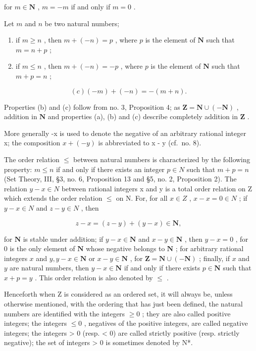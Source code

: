 for \(m \in \mathbf{N}\) , \(m = -m\) if and only if \(m = 0\) .

Let \(m\) and \(n\) be two natural numbers;

\begin{enumerate}
\def\labelenumi{(\alph{enumi})}
\item
  if \(m \geqslant n\) , then \(m + (-n) = p\) , where \(p\) is the element of \(\mathbf{N}\) such that \(m = n + p\) ;
\item
  if \(m \leqslant n\) , then \(m + (-n) = -p\) , where \(p\) is the element of \(\mathbf{N}\) such that \(m + p = n\) ;
\end{enumerate}

\[
(c) (- m) + (- n) = - (m + n).
\]

Properties (b) and (c) follow from no. 3, Proposition 4; as \(\mathbf{Z} = \mathbf{N} \cup (-\mathbf{N})\) , addition in \(\mathbf{N}\) and properties (a), (b) and (c) describe completely addition in \(\mathbf{Z}\) .

More generally -x is used to denote the negative of an arbitrary rational integer x; the composition \(x + (-y)\) is abbreviated to x - y (cf.~no. 8).

The order relation \(\leqslant\) between natural numbers is characterized by the following property: \(m \leqslant n\) if and only if there exists an integer \(p \in N\) such that \(m + p = n\) (Set Theory, III, §3, no. 6, Proposition 13 and §5, no. 2, Proposition 2). The relation \(y - x \in N\) between rational integers x and y is a total order relation on Z which extends the order relation \(\leqslant\) on N. For, for all \(x \in Z\) , \(x - x = 0 \in N\) ; if \(y - x \in N\) and \(z - y \in N\) , then

\[
z - x = (z - y) + (y - x) \in \mathbf {N},
\]

for \(\mathbf{N}\) is stable under addition; if \(y - x \in \mathbf{N}\) and \(x - y \in \mathbf{N}\) , then \(y - x = 0\) , for \(0\) is the only element of \(\mathbf{N}\) whose negative belongs to \(\mathbf{N}\) ; for arbitrary rational integers \(x\) and \(y, y - x \in \mathbf{N}\) or \(x - y \in \mathbf{N}\) , for \(\mathbf{Z} = \mathbf{N} \cup (-\mathbf{N})\) ; finally, if \(x\) and \(y\) are natural numbers, then \(y - x \in \mathbf{N}\) if and only if there exists \(p \in \mathbf{N}\) such that \(x + p = y\) . This order relation is also denoted by \(\leqslant\) .

Henceforth when Z is considered as an ordered set, it will always be, unless otherwise mentioned, with the ordering that has just been defined, the natural numbers are identified with the integers \(\geqslant 0\) ; they are also called positive integers; the integers \(\leqslant 0\) , negatives of the positive integers, are called negative integers; the integers \textgreater{} 0 (resp. \textless{} 0) are called strictly positive (resp. strictly negative); the set of integers \textgreater{} 0 is sometimes denoted by N*.

